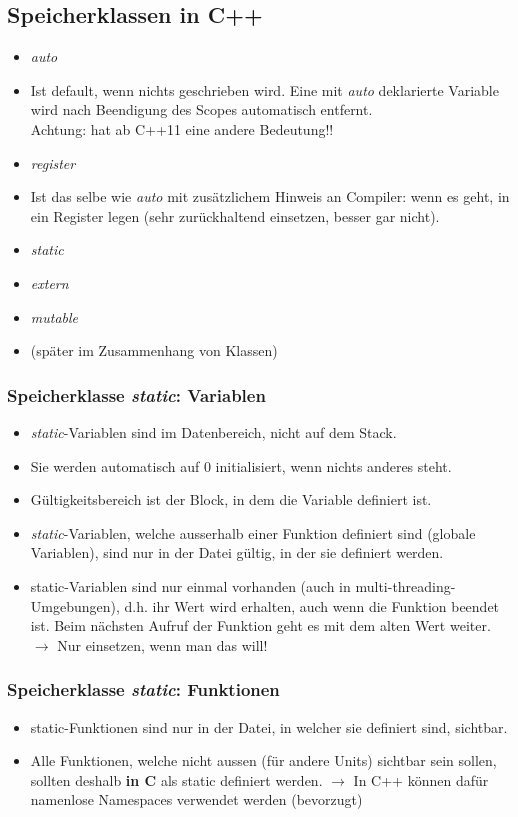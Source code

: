 \subsection{Speicherklassen in C++}
\begin{itemize}
	\item \emph{auto}
	\item[\-] Ist default, wenn nichts geschrieben wird. Eine mit \emph{auto} deklarierte Variable wird nach Beendigung des Scopes automatisch entfernt.\\
	Achtung: hat ab C++11 eine andere Bedeutung!!
	\item \emph{register}
	\item[\-] Ist das selbe wie \emph{auto} mit zusätzlichem Hinweis an Compiler: wenn es geht, in ein Register legen (sehr zurückhaltend einsetzen, besser gar nicht).
	\item \emph{static}
	\item \emph{extern}
	\item \emph{mutable}
	\item[\-] (später im Zusammenhang von Klassen)
\end{itemize}

\subsubsection{Speicherklasse \emph{static}: Variablen}
\begin{itemize}
	\item \emph{static}-Variablen sind im Datenbereich, nicht auf dem Stack.
	\item Sie werden automatisch auf 0 initialisiert, wenn nichts anderes steht.
	\item Gültigkeitsbereich ist der Block, in dem die Variable definiert ist.
	\item \emph{static}-Variablen, welche ausserhalb einer Funktion definiert sind (globale Variablen), sind nur in der Datei gültig, in der sie definiert werden.
	\item static-Variablen sind nur einmal vorhanden (auch in multi-threading-Umgebungen), d.h. ihr Wert wird erhalten, auch wenn die Funktion beendet ist. Beim nächsten Aufruf der Funktion geht es mit dem alten Wert weiter. $\rightarrow$ \color{red}Nur einsetzen, wenn man das will!\color{black}
\end{itemize}

\subsubsection{Speicherklasse \emph{static}: Funktionen}
\begin{itemize}
	\item static-Funktionen sind nur in der Datei, in welcher sie definiert sind, sichtbar.
	\item Alle Funktionen, welche nicht aussen (für andere Units) sichtbar sein sollen, sollten deshalb \textbf{in C} als static definiert werden. $\rightarrow$ \color{red}In C++ können dafür namenlose Namespaces verwendet werden (bevorzugt)\color{black}
\end{itemize}

